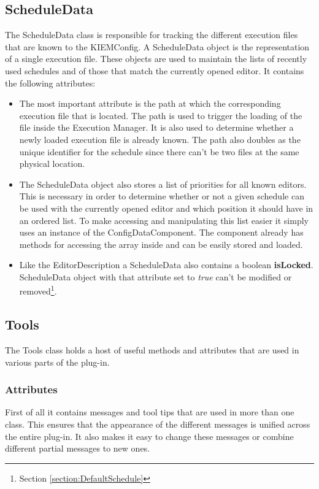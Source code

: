 \subsection{ScheduleData}
\label{section:ScheduleData}
The ScheduleData class is responsible for tracking the different execution files that are known
to the \ac{KIEMConfig}. A ScheduleData object is the representation of a single execution file. 
These objects are used to maintain the lists of recently used schedules and of those that match the 
currently opened editor. It contains the following attributes:
\begin{itemize}
 \item The most important attribute is the path at which the corresponding execution file that is located. 
The path is used to trigger the loading of the file inside
the Execution Manager. It is also used to determine whether a newly loaded execution file
is already known. The path also doubles as the unique identifier for the schedule since there
can't be two files at the same physical location.
\item The ScheduleData object also stores a list of priorities for all known editors. This is
necessary in order to determine whether or not a given schedule can be used with the currently
opened editor and which position it should have in an ordered list. To make accessing and manipulating
this list easier it simply uses an instance of the ConfigDataComponent. The component already has
methods for accessing the array inside and can be easily stored and loaded.
 \item Like the EditorDescription a ScheduleData also contains a boolean \textbf{isLocked}. ScheduleData
object with that attribute set to \textit{true} can't be modified or removed\footnote{Section \ref{section:DefaultSchedule}}.
\end{itemize}

\subsection{Tools}
\label{section:Tools}
The Tools class holds a host of useful methods and attributes that are used in various parts of the plug-in.

\subsubsection{Attributes}
\label{section:ToolsAttributes}
First of all it contains messages and tool tips that are used in more than one class.
This ensures that the appearance of the different messages is unified across the entire plug-in. It also
makes it easy to change these messages or combine different partial messages to new ones.

